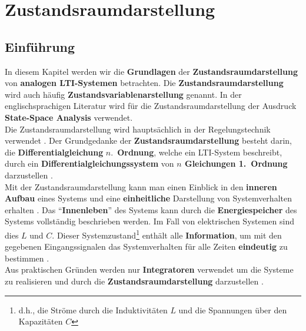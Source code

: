 \renewcommand{\thesection}{\thechapter.\arabic{section}}
\setcounter{Aufgabe}{0}\setcounter{Beispiel}{0}
\chapter{Zustandsraumdarstellung}\label{kapitel_ZVD} 
\section{Einf\"uhrung}
In diesem Kapitel werden wir die {\bf Grundlagen} der {\bf Zustandsraumdarstellung} von {\bf analogen
LTI-Systemen} betrachten.  Die {\bf
  Zustandsraumdarstellung} wird auch h\"aufig {\bf
  Zustandsvariablenarstellung}
genannt. In der englischsprachigen
Literatur wird  f\"ur die Zustandsraumdarstellung der Ausdruck {\bf State-Space Analysis} verwendet.\\

\nit Die Zustandsraumdarstellung wird haupts\"achlich in der
Regelungstechnik verwendet \cite{UNB:81}.  Der
Grundgedanke der {\bf Zustandsraumdarstellung} besteht darin, die {\bf
  Differentialgleichung} {\boldmath
  $n.$}~{\bf Ordnung}, welche ein LTI-System beschreibt, durch ein {\bf
  Differentialgleichungssystem}
von {\bf {\boldmath $n$} Gleichungen 1.~Ordnung} darzustellen \cite{WOS:88}.\\

\nit Mit der Zustandsraumdarstellung kann man einen Einblick in den {\bf
  inneren Aufbau} eines Systems und eine {\bf einheitliche} Darstellung
von Systemverhalten erhalten \cite{GIR:RAB:STE:05}. Das ``{\bf Innenleben}'' des Systems kann
durch die {\bf Energiespeicher} des Systems
vollst\"andig beschrieben werden. Im Fall von elektrischen Systemen sind dies {\boldmath
  $L$} und {\boldmath $C$}. Dieser Systemzustand\footnote{d.h., die Str\"ome durch die Induktivit\"aten $L$ und die Spannungen \"uber den Kapazit\"aten $C$}
enth\"alt alle {\bf Information}, um mit den
gegebenen Eingangssignalen das Systemverhalten f\"ur alle Zeiten {\bf
  eindeutig} zu bestimmen \cite{GIR:RAB:STE:05}.\\ 

\nit Aus praktischen
Gr\"unden werden nur {\bf Integratoren} verwendet um die Systeme zu realisieren und durch die {\bf Zustandsraumdarstellung}
darzustellen \cite{WEI:89}.



